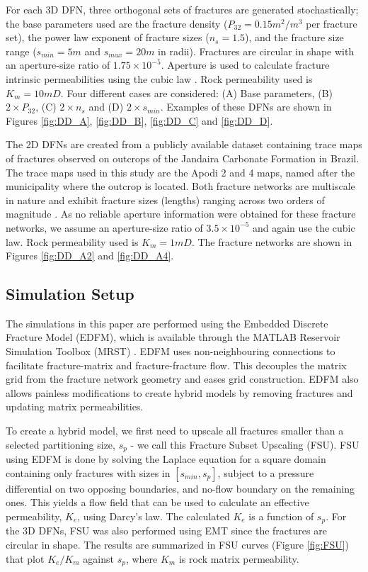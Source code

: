 \documentclass[a4paper]{article}
\begin{document}
For each 3D DFN, three orthogonal sets of fractures are generated stochastically; the base parameters used are the fracture density ($P_{32}=0.15m^2/m^3$ per fracture set), the power law exponent of fracture sizes ($n_s=1.5$), and the fracture size range ($s_{min}=5m$ and $s_{max}=20m$ in radii). Fractures are circular in shape with an aperture-size ratio of $1.75\times 10^{-5}$. Aperture is used to calculate fracture intrinsic permeabilities using the cubic law \citep{Witherspoon1980}. Rock permeability used is $K_m=10mD$. Four different cases are considered: (A) Base parameters, (B) $2\times P_{32}$, (C) $2\times n_s$ and (D) $2\times s_{min}$. Examples of these DFNs are shown in Figures \ref{fig:DD_A}, \ref{fig:DD_B}, \ref{fig:DD_C} and \ref{fig:DD_D}.

The 2D DFNs are created from a publicly available dataset containing trace maps of fractures observed on outcrops of the Jandaira Carbonate Formation in Brazil. The trace maps used in this study are the Apodi 2 and 4 maps, named after the municipality where the outcrop is located. Both fracture networks are multiscale in nature and exhibit fracture sizes (lengths) ranging across two orders of magnitude \citep{Bisdom2017}. As no reliable aperture information were obtained for these fracture networks, we assume an aperture-size ratio of $3.5\times 10^{-5}$ and again use the cubic law. Rock permeability used is $K_m=1mD$. The fracture networks are shown in Figures \ref{fig:DD_A2} and \ref{fig:DD_A4}.


\subsection{Simulation Setup}
The simulations in this paper are performed using the Embedded Discrete Fracture Model (EDFM), which is available through the MATLAB Reservoir Simulation Toolbox (MRST) \citep{Lee2001, Lie2015, Moinfar2013}. EDFM uses non-neighbouring connections to facilitate fracture-matrix and fracture-fracture flow. This decouples the matrix grid from the fracture network geometry and eases grid construction. EDFM also allows painless modifications to create hybrid models by removing fractures and updating matrix permeabilities.

To create a hybrid model, we first need to upscale all fractures smaller than a selected partitioning size, $s_p$ - we call this Fracture Subset Upscaling (FSU). FSU using EDFM is done by solving the Laplace equation for a square domain containing only fractures with sizes in $[s_{min},s_p]$, subject to a pressure differential on two opposing boundaries, and no-flow boundary on the remaining ones. This yields a flow field that can be used to calculate an effective permeability, $K_{e}$, using Darcy's law. The calculated $K_{e}$ is a function of $s_p$. For the 3D DFNs, FSU was also performed using EMT since the fractures are circular in shape. The results are summarized in FSU curves (Figure \ref{fig:FSU}) that plot $K_{e}/K_m$ against $s_p$, where $K_m$ is rock matrix permeability.
\end{document}
